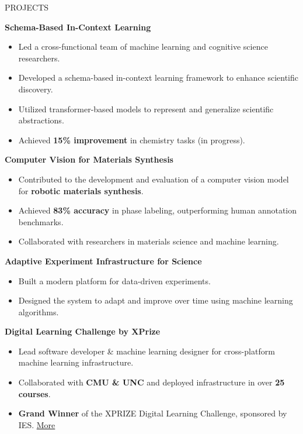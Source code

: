 \documentclass{resume} %
\begin{document}
\begin{rSection}{PROJECTS}
\vspace{-1.25em}
    \item \textbf{Schema-Based In-Context Learning}
    \begin{itemize}
        \item Led a cross-functional team of machine learning and cognitive science researchers.
        \item Developed a schema-based in-context learning framework to enhance scientific discovery.
        \item Utilized transformer-based models to represent and generalize scientific abstractions.
        \item Achieved \textbf{15\% improvement} in chemistry tasks (in progress).
    \end{itemize}
    \newpage
    \item \textbf{Computer Vision for Materials Synthesis}
    \begin{itemize}
        \item Contributed to the development and evaluation of a computer vision model for \textbf{robotic materials synthesis}.
        \item Achieved \textbf{83\% accuracy} in phase labeling, outperforming human annotation benchmarks.
        \item Collaborated with researchers in materials science and machine learning.
    \end{itemize}

    \item \textbf{Adaptive Experiment Infrastructure for Science}
    \begin{itemize}
        \item Built a modern platform for data-driven experiments.
        \item Designed the system to adapt and improve over time using machine learning algorithms.
    \end{itemize}

    \item \textbf{Digital Learning Challenge by XPrize}
    \begin{itemize}
        \item Lead software developer \& machine learning designer for cross-platform machine learning infrastructure.
        \item Collaborated with \textbf{CMU \& UNC} and deployed infrastructure in over \textbf{25 courses}.
        \item \textbf{Grand Winner} of the XPRIZE Digital Learning Challenge, sponsored by IES. \href{https://www.xprize.org/challenge/digitallearning/finalist-teams}{More}
    \end{itemize}


\end{rSection}
\end{document}
